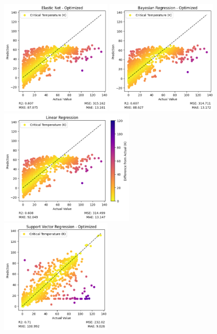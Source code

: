 \documentclass[twocolumn, nofootinbib, secnumarabic, amssymb, nobibnotes, aps, prd]{revtex4-2}
\begin{document}
\begin{figure}[t] %
   \centering
   \includegraphics[height=2.23in]{images/subfigures/no_uncertainty/elastic_net_optimized.png}
   \includegraphics[height=2.23in]{images/subfigures/no_uncertainty/bayesian_regression_optimized.png}
   \includegraphics[height=2.23in]{images/subfigures/no_uncertainty/linear_regression.png}
   \includegraphics[height=2.23in]{images/subfigures/no_uncertainty/support_vector_regression_optimized.png}

\end{figure}
\end{document}
